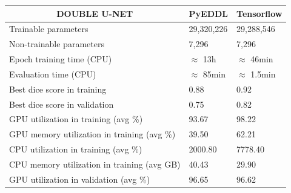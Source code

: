 \vspace{1cm}

\begin{table}[!htb]
\centering
\begin{tabular}{l|l|l|}
\cline{2-3}
\multicolumn{1}{c|}{\textbf{DOUBLE U-NET}}                              & \multicolumn{1}{c|}{\textbf{PyEDDL}} & \multicolumn{1}{c|}{\textbf{Tensorflow}} \\ \hline
\multicolumn{1}{|l|}{Trainable parameters}                       &               29,320,226                       &                              29,288,546            \\ \hline
\multicolumn{1}{|l|}{Non-trainable parameters}                   &                   7,296                   &                                     7,296     \\ \hline
\multicolumn{1}{|l|}{Epoch training time (CPU)}                        &             $\approx$ 13h                         &                                    $\approx$ 46min      \\ \hline
\multicolumn{1}{|l|}{Evaluation time (CPU)}                            &             $\approx$ 85min                         &                                    $\approx$ 1.5min      \\ \hline
\multicolumn{1}{|l|}{Best dice score in training}                &                  0.88                    &                                     0.92     \\ \hline
\multicolumn{1}{|l|}{Best dice score in validation}              &                  0.75                    &                                     0.82     \\ \hline
\multicolumn{1}{|l|}{GPU utilization in training (avg \%)}          &                 93.67                     &                                   98.22       \\ \hline
\multicolumn{1}{|l|}{GPU memory utilization in training (avg \%)}   &                  39.50                    &                                    62.21      \\ \hline
\multicolumn{1}{|l|}{CPU utilization in training (avg \%)}          &                   2000.80                   &                                   7778.40       \\ \hline
\multicolumn{1}{|l|}{CPU memory utilization in training (avg GB)}   &                   40.43                   &                                     29.90     \\ \hline
\multicolumn{1}{|l|}{GPU utilization in validation (avg \%)}        &                  96.65                    &                                    96.62      \\ \hline

\end{tabular}
\end{table}
